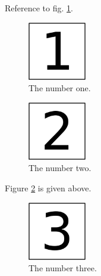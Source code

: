 Reference to fig. \ref{fig:1}.

\begin{figure}
\centering
\includegraphics[width=1in,height=\textheight]{img/fig-1.png}
\caption{The number one.\label{fig:1}}
\end{figure}

\begin{figure}
\centering
\includegraphics[width=1in,height=\textheight]{img/fig-2.png}
\caption{The number two.\label{fig:2}}
\end{figure}

Figure \ref{fig:2} is given above.

\begin{figure}
\centering
\includegraphics[width=1in,height=\textheight]{img/fig-3.png}
\caption{The number three.}
\end{figure}
